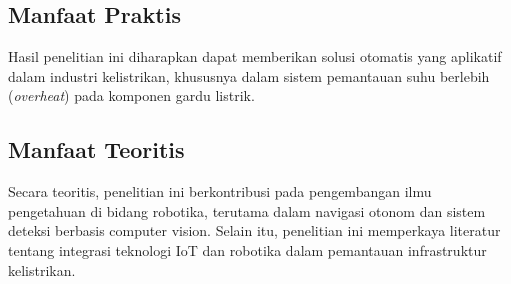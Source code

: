 \subsection{Manfaat Praktis}
Hasil penelitian ini diharapkan dapat memberikan solusi otomatis yang aplikatif dalam industri kelistrikan, khususnya dalam sistem pemantauan suhu berlebih (\emph{overheat}) pada komponen gardu listrik. 

\subsection{Manfaat Teoritis}
Secara teoritis, penelitian ini berkontribusi pada pengembangan ilmu pengetahuan di bidang robotika, terutama dalam navigasi otonom dan sistem deteksi berbasis computer vision. Selain itu, penelitian ini memperkaya literatur tentang integrasi teknologi IoT dan robotika dalam pemantauan infrastruktur kelistrikan.